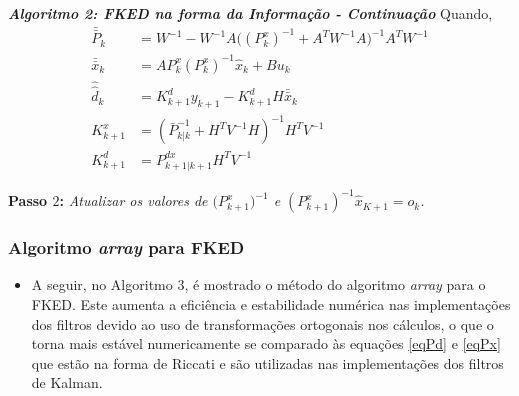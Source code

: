 \begin{frame}
	\hline
	\small	\emph{\textbf{Algoritmo 2: FKED na forma da Informação - Continuação}}
	\hline
	\vspace{0.1cm}
	\small Quando,
	\begin{align}
		\bar{\bar{P}}_{k} &= W^{-1} - W^{-1}A\big((P^{x}_{k})^{-1} + A^{T}W^{-1}A \big)^{-1}A^{T}W^{-1}\nonumber \\
		\bar{\bar{x}}_{k} &= AP^{x}_{k}(P^{x}_{k})^{-1}\hat{x}_{k} + Bu_{k}\nonumber \\
		\hat{\hat{d}}_{k} &= K^{d}_{k+1}y_{k+1} - K^{d}_{k+1}H\bar{\bar{x}}_{k}\\
		K_{k+1}^{x} &= (\bar{P}_{k|k}^{-1} + H^{T}V^{-1}H)^{-1}H^{T}V^{-1}\nonumber \\
		K_{k+1}^{d} &= P_{k+1|k+1}^{dx}H^{T}V^{-1} \nonumber
	\end{align}
	
	\small \textbf{Passo $2$:} \textit{Atualizar os valores de $\big(P^{x}_{k+1}\big)^{-1}$ e $(P^{x}_{k+1})^{-1}\hat{x}_{K+1} = o_{k}$.}
	\hline
\end{frame}

\begin{frame}
	\frametitle{Algoritmo \textit{array} para FKED}
	\begin{itemize}
		\item A seguir, no Algoritmo 3, é mostrado o método do algoritmo \textit{array} para o FKED. Este aumenta a eficiência e estabilidade numérica nas implementações dos filtros devido ao uso de transformações ortogonais nos cálculos, o que o torna mais estável numericamente se comparado às equações \eqref{eqPd} e \eqref{eqPx} que estão na forma de Riccati e são utilizadas nas implementações dos filtros de Kalman.
	\end{itemize}
\end{frame}

